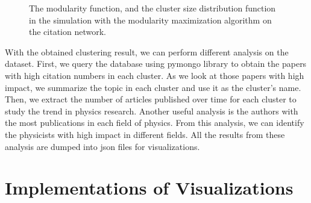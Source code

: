 \documentclass{article} %
\begin{document}
\begin{figure}[h]
  	\centering
	\vspace{-20pt}
 	\caption{The modularity function, and the cluster size distribution function in the simulation with the modularity maximization algorithm on the citation network.}
 	\vspace{-10pt}
  \label{fig:modularity_whole}
\end{figure}

With the obtained clustering result, we can perform different analysis on the dataset. First, we query the database using pymongo library to obtain the papers with high citation numbers in each cluster. As we look at those papers with high impact, we summarize the topic in each cluster and use it as the cluster's name. Then, we extract the number of articles published over time for each cluster to study the trend in physics research. Another useful analysis is the authors with the most publications in each field of physics. From this analysis, we can identify the physicists with high impact in different fields. All the results from these analysis are dumped into json files for visualizations.

\section{Implementations of Visualizations}
\end{document}
